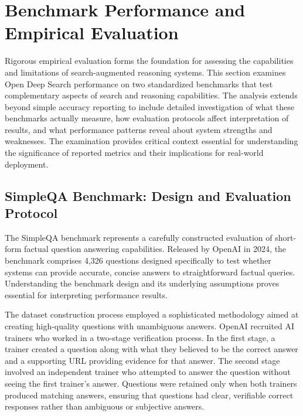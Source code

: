 \section{Benchmark Performance and Empirical Evaluation}

Rigorous empirical evaluation forms the foundation for assessing the capabilities and limitations of search-augmented reasoning systems. This section examines Open Deep Search performance on two standardized benchmarks that test complementary aspects of search and reasoning capabilities. The analysis extends beyond simple accuracy reporting to include detailed investigation of what these benchmarks actually measure, how evaluation protocols affect interpretation of results, and what performance patterns reveal about system strengths and weaknesses. The examination provides critical context essential for understanding the significance of reported metrics and their implications for real-world deployment.

\subsection{SimpleQA Benchmark: Design and Evaluation Protocol}

The SimpleQA benchmark represents a carefully constructed evaluation of short-form factual question answering capabilities. Released by OpenAI in 2024, the benchmark comprises 4,326 questions designed specifically to test whether systems can provide accurate, concise answers to straightforward factual queries. Understanding the benchmark design and its underlying assumptions proves essential for interpreting performance results.

The dataset construction process employed a sophisticated methodology aimed at creating high-quality questions with unambiguous answers. OpenAI recruited AI trainers who worked in a two-stage verification process. In the first stage, a trainer created a question along with what they believed to be the correct answer and a supporting URL providing evidence for that answer. The second stage involved an independent trainer who attempted to answer the question without seeing the first trainer's answer. Questions were retained only when both trainers produced matching answers, ensuring that questions had clear, verifiable correct responses rather than ambiguous or subjective answers.

